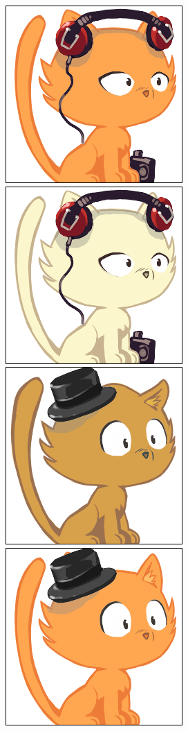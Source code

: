 \documentclass[a4paper, 12pt]{article}
\begin{document}
  \includegraphics[scale=0.45]{out/5.png}
  \includegraphics[scale=0.45]{out/6.png}
  \includegraphics[scale=0.45]{out/7.png}
  \includegraphics[scale=0.45]{out/8.png}
\end{document}
